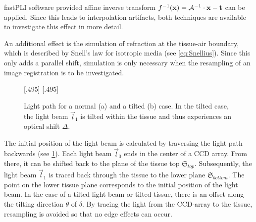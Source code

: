 \ac{fastPLI} software provided affine inverse transform $f^{-1}(\mathbf{x}) = \mathcal{A}^{-1} \cdot \mathbf{x} - \mathbf{t}$ can be applied.
Since this leads to interpolation artifacts, both techniques are available to investigate this effect in more detail.
\par
%
An additional effect is the simulation of refraction at the tissue-air boundary, which is described by Snell's law for isotropic media (see \cref{eq:Snellius}).
Since this only adds a parallel shift, simulation is only necessary when the resampling of an image registration is to be investigated.
\par
%
\begin{figure}[!t]
\setlength{\tikzwidth}{0.42\textwidth}
[.495\textwidth]{
\def\tilt{0}
\def\nindex{2.25}
}\hfill
{}[.495\textwidth]{
}
\caption[Light path]{Light path for a normal (a) and a tilted (b) case. In the tilted case, the light beam $\vec{l}_1$ is tilted within the tissue and thus experiences an optical shift $\Delta$.}
\label{fig:tilted_side_view}
\end{figure}
%
The initial position of the light beam is calculated by traversing the light path backwards (see \cref{fig:tilted_side_view}).
Each light beam $\vec{l}_0$ ends in the center of a \ac{CCD} array. 
From there, it can be shifted back to the plane of the tissue top $\mathfrak{S}_{top}$.
Subsequently, the light beam $\vec{l}_1$ is traced back through the tissue to the lower plane $\mathfrak{S}_{bottom}$.
The point on the lower tissue plane corresponds to the initial position of the light beam.
In the case of a tilted light beam or tilted tissue, there is an offset along the tilting direction $\theta$ of $\delta$.
By tracing the light from the \ac{CCD}-array to the tissue, resampling is avoided so that no edge effects can occur.
\par
%
\begin{lstfloat}[!p]
	
	\caption{Pseudocode simulation }
	\label{alg:simulation}
\end{lstfloat}
%
